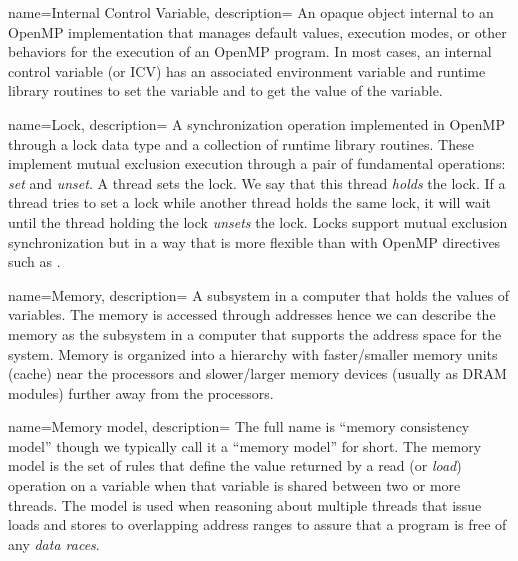 {
   name={Internal Control Variable},
   description={
   An opaque object internal to an OpenMP implementation that manages default values, execution modes, or other behaviors for the execution 
   of an OpenMP program.  In most cases, an internal control
   variable (or ICV) has an associated environment variable  and runtime library routines to set the variable and to get the value
   of the variable. 
   }
}   


{
   name={Lock},
   description={
   A synchronization operation implemented in OpenMP through a lock data type and a
   collection of runtime library routines.  These implement mutual exclusion execution through
   a pair of fundamental operations: \emph{set} and \emph{unset}.  A thread sets the lock.  We
   say that this thread \emph{holds} the lock.  If a thread tries to set a lock while another thread
   holds the same lock, it will wait until the thread holding the lock \emph{unsets} the lock.
   Locks support mutual exclusion synchronization but in a way that is more flexible than with
   OpenMP directives such as . 
   }
}   

{
   name={Memory},
   description={
   A subsystem in a computer that holds the values of variables.  The memory is accessed through
   addresses hence we can describe the memory as the subsystem in a computer that supports the
   address space for the system.  Memory is organized into a hierarchy with faster/smaller memory units (cache) 
   near the processors and slower/larger memory devices (usually as DRAM modules) further away from 
   the processors. 
   }
}   

{
   name={Memory model},
   description={
            The full name is ``memory consistency model'' though we typically call 
            it a ``memory model'' for short.  The memory model is the set of rules that define 
            the value returned by a read (or \emph{load}) operation on a variable when that 
            variable is shared between two or more threads.   The model is used when 
            reasoning about multiple threads that issue loads and stores to overlapping address ranges
            to assure that a program is free of any \emph{data races}.}
}


